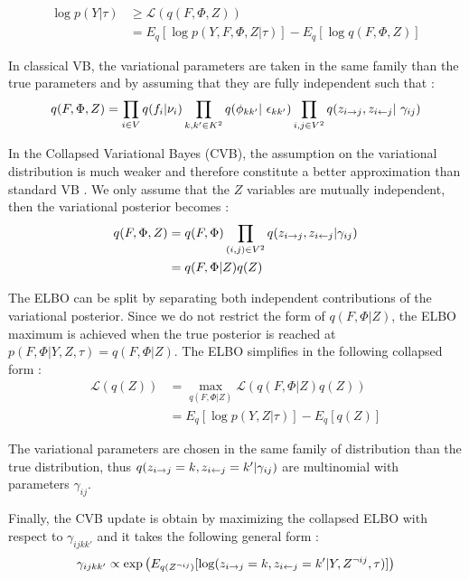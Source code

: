 \begin{align}
    \log p(Y | \tau) &\geq \mathcal{L}(q(F, \Phi, Z)) \\
    &= E_q[\log p(Y, F, \Phi, Z | \tau)] - E_q[\log q(F, \Phi, Z)] \nonumber \nonumber
\end{align}

In classical VB, the variational parameters are taken in the same family than the true parameters and by assuming that they are fully independent such that :
\begin{equation}
q(F, \Phi, Z) = \prod_{i\in V}q(f_i | \nu_i) \prod_{k,k' \in K^2}q(\phi_{kk'} | \epsilon_{kk'})\prod_{i,j \in V^2}q(\zij, \zji | \gamma_{ij})
\end{equation}

In the Collapsed Variational Bayes (CVB), the assumption on the variational distribution is much weaker and therefore constitute a better approximation than standard VB \cite{teh2006collapsed}. We only assume that the $Z$ variables are mutually independent, then the variational posterior becomes : 
\begin{align}
q(F, \Phi, Z) &= q(F,\Phi) \prod_{(i,j)\in V^2}q(z_{i\rightarrow j}, z_{i\leftarrow j} | \gamma_{ij}) \\
	&= q(F, \Phi | Z)q(Z)
\end{align}

The ELBO can be split by separating both independent contributions of the variational posterior. Since we do not restrict the form of $q(F, \Phi | Z)$, the ELBO maximum is achieved when the true posterior is reached at $p(F, \Phi | Y, Z,  \tau) = q(F, \Phi | Z)$. The ELBO simplifies in the following collapsed form :
\begin{align}
    \mathcal{L}(q(Z)) &= \max_{q(F,\Phi|Z)} \mathcal{L}(q(F, \Phi|Z)q(Z)) \\
    &= E_q[\log p(Y,Z|\tau)] - E_q[q(Z)]
\end{align}

The variational parameters are chosen in the same family of distribution than the true distribution, thus $q(z_{i\rightarrow j}=k, z_{i\leftarrow j}=k' | \gamma_{ij})$ are multinomial with parameters $\gamma_{ij}$.

Finally, the CVB update is obtain by maximizing the collapsed ELBO with respect to $\gamma_{ijkk'}$ and it takes the following general form :
\begin{equation} \label{eq:cvb_update}
    \gamma_{ijkk'} \propto \exp \left( E_{q(Z^{\neg ij})} [\log(z_{i\rightarrow j}=k, z_{i\leftarrow j}=k' |Y, Z^{\neg ij}, \tau)] \right)
\end{equation}

